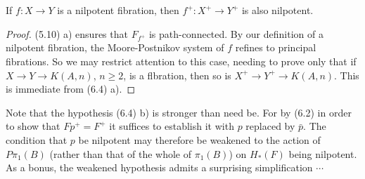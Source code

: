 \begin{lemma}
  If $f\colon  X\longrightarrow Y$ is a nilpotent fibration, then $f^+\colon  X^+\longrightarrow Y^+$ is also nilpotent.
\end{lemma}
\begin{proof}
 (5.10) a) ensures that $F_{f^+}$ is path-connected. By our definition of a nilpotent fibration,  the Moore-Postnikov system of $f$ refines to principal fibrations. So we may restrict attention to this case, needing to prove only that if $X \longrightarrow Y \longrightarrow K(A,n)$, $n \geqslant 2$, is a flbration, then so is $X^+ \longrightarrow Y^+ \longrightarrow K(A,n)$. This is immediate from (6.4) a).
 \end{proof}
  
Note that the hypothesis (6.4) b) is stronger than need be. For by (6.2) in order to show that $F{p^+} = F^+$ it suffices to establish it with $p$ replaced by $\bar{p}$. The condition that $p$ be nilpotent may therefore be weakened to the action of $P\pi_1(B)$ (rather than that of the whole of $\pi_1(B)$) on $H_*(F)$ being nilpotent. As a bonus, the weakened hypothesis admits a surprising simplification $\cdots$

